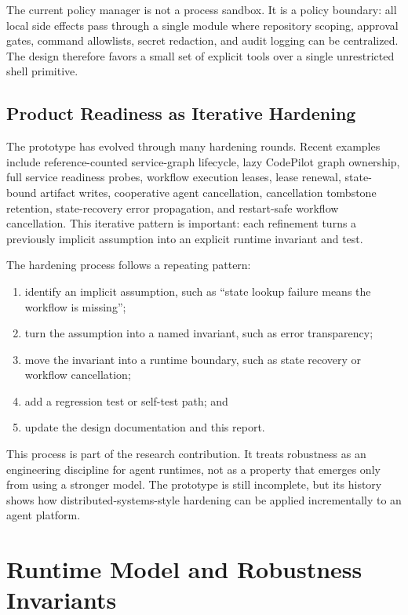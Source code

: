 \documentclass[manuscript,screen,review]{acmart}
\newcommand{\codepilot}{CodePilot\xspace}
\begin{document}
The current policy manager is not a process sandbox. It is a policy boundary:
all local side effects pass through a single module where repository scoping,
approval gates, command allowlists, secret redaction, and audit logging can be
centralized. The design therefore favors a small set of explicit tools over a
single unrestricted shell primitive.

\subsection{Product Readiness as Iterative Hardening}

The prototype has evolved through many hardening rounds. Recent examples
include reference-counted service-graph lifecycle, lazy \codepilot graph
ownership, full service readiness probes, workflow execution leases, lease
renewal, state-bound artifact writes, cooperative agent cancellation,
cancellation tombstone retention, state-recovery error propagation, and
restart-safe workflow cancellation. This
iterative pattern is important: each refinement turns a previously implicit
assumption into an explicit runtime invariant and test.

The hardening process follows a repeating pattern:

\begin{enumerate}
  \item identify an implicit assumption, such as ``state lookup failure means the
  workflow is missing'';
  \item turn the assumption into a named invariant, such as error transparency;
  \item move the invariant into a runtime boundary, such as state recovery or
  workflow cancellation;
  \item add a regression test or self-test path; and
  \item update the design documentation and this report.
\end{enumerate}

This process is part of the research contribution. It treats robustness as an
engineering discipline for agent runtimes, not as a property that emerges only
from using a stronger model. The prototype is still incomplete, but its history
shows how distributed-systems-style hardening can be applied incrementally to an
agent platform.

\section{Runtime Model and Robustness Invariants}
\end{document}
